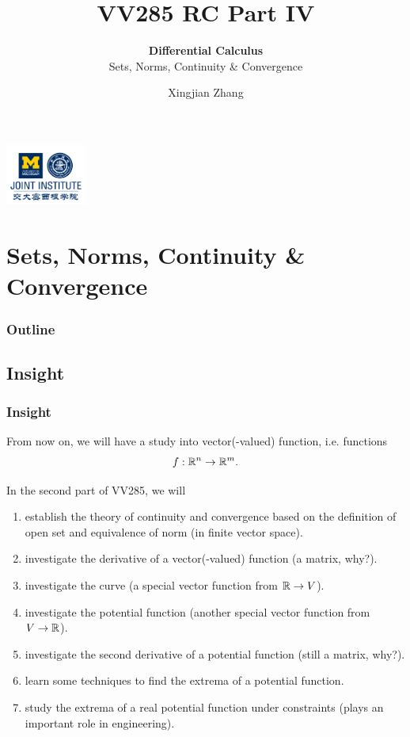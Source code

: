 \documentclass[12pt, t]{beamer}
\title{VV285 RC Part IV}
\subtitle{\textbf{Differential Calculus}\\\large Sets, Norms, Continuity \& Convergence}
\institute[UM-SJTU JI]{Univerity of Michigan-Shanghai Jiao Tong University Joint Institute}
\author{Xingjian Zhang}
\begin{document}
\begin{frame}
    \titlepage
    \begin{center}
        \includegraphics[height=2cm]{logo2.png}
    \end{center}
\end{frame}

\section{Sets, Norms, Continuity \& Convergence}
\begin{frame}
    \frametitle{Outline}
    \begin{spacing}{1.5}
        \tableofcontents[currentsubsection,hideothersubsections,sectionstyle=hide]
    \end{spacing}
\end{frame}

\subsection{Insight}
\begin{frame}[allowframebreaks]
    \frametitle{Insight}
    From now on, we will have a study into vector(-valued) function, i.e. functions
    \[f:\mathbb{R}^n\to\mathbb{R}^m.\]

    In the second part of VV285, we will \small
    \begin{enumerate}
        \item establish the theory of continuity and convergence based on the definition of open set and equivalence of norm (in finite vector space).
        \item investigate the derivative of a vector(-valued) function (a matrix, why?).
        \item investigate the curve (a special vector function from $\mathbb{R}\to V$).
        \item investigate the potential function (another special vector function from $V\to \mathbb{R}$).
        \item investigate the second derivative of a potential function (still a matrix, why?).
        \item learn some techniques to find the extrema of a potential function.
        \item study the extrema of a real potential function under constraints (plays an important role in engineering).
    \end{enumerate}
\end{frame}
\end{document}
